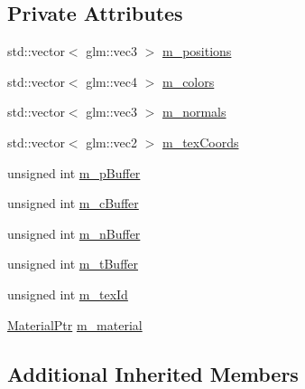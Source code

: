 \subsection*{Private Attributes}
\begin{DoxyCompactItemize}
\item 
std\+::vector$<$ glm\+::vec3 $>$ \hyperlink{classTexturedCubeRenderable_a2ee41ec753f754af7d528630053f1f9b}{m\+\_\+positions}
\item 
std\+::vector$<$ glm\+::vec4 $>$ \hyperlink{classTexturedCubeRenderable_ab950dfea6aea614a9eef369a504447e0}{m\+\_\+colors}
\item 
std\+::vector$<$ glm\+::vec3 $>$ \hyperlink{classTexturedCubeRenderable_abc11eaad97658a55aa7ae99814e6b0a1}{m\+\_\+normals}
\item 
std\+::vector$<$ glm\+::vec2 $>$ \hyperlink{classTexturedCubeRenderable_a81ca120663ab6da28e3689bfc38dbbf7}{m\+\_\+tex\+Coords}
\item 
unsigned int \hyperlink{classTexturedCubeRenderable_a42c8b5b8fa3dbb91f5e3b1efc0969cb9}{m\+\_\+p\+Buffer}
\item 
unsigned int \hyperlink{classTexturedCubeRenderable_aeddfc02d05a09c1a233c3ed6c266c4da}{m\+\_\+c\+Buffer}
\item 
unsigned int \hyperlink{classTexturedCubeRenderable_a165074001bbe9213adf5de7c8232f454}{m\+\_\+n\+Buffer}
\item 
unsigned int \hyperlink{classTexturedCubeRenderable_aa778fcc1fa60f6184fcbf6657b240065}{m\+\_\+t\+Buffer}
\item 
unsigned int \hyperlink{classTexturedCubeRenderable_a11138b4a8f2ab16ce10d52443cf9b493}{m\+\_\+tex\+Id}
\item 
\hyperlink{Material_8hpp_a1d47cd05ca683e287435cf0b363fbfe1}{Material\+Ptr} \hyperlink{classTexturedCubeRenderable_a2e567d5bdb44623b91a748761d7d4ee6}{m\+\_\+material}
\end{DoxyCompactItemize}
\subsection*{Additional Inherited Members}



